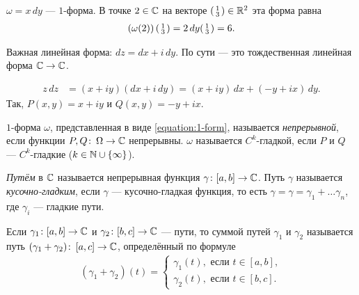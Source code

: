 \begin{exmpl*}
 $\omega = x \, dy$ --- $1$-форма. В точке $2 \in \mathbb{C}$ на векторе $ \begin{psmallmatrix}
  1 \\ 3
 \end{psmallmatrix} \in \mathbb{R}^{2}$ эта форма равна
 \begin{align*}
  \left(\omega (2)\right) \begin{psmallmatrix}
   1 \\ 3
  \end{psmallmatrix}= 2 \, dy \begin{psmallmatrix}
   1 \\ 3
  \end{psmallmatrix} = 6
 .\end{align*} 
\end{exmpl*}
\begin{exmpl*}
 Важная линейная форма: $dz = dx + i\,dy$. По сути --- это тождественная линейная форма $\mathbb{C} \to \mathbb{C}$.
\end{exmpl*}
\begin{exmpl*}
 \begin{align*}
  z\,dz &= (x + iy)(dx + i\,dy) = (x + iy)\,dx + (-y +ix)\,dy
 .\end{align*} Так, $P(x,y) = x + iy$ и $Q(x,y) = -y + ix$.
\end{exmpl*}
\begin{df*}
 $1$-форма $\omega$, представленная в виде \eqref{equation:1-form}, называется \textit{непрерывной}, если функции $P,Q \colon\, \Omega \to \mathbb{C}$ непрерывны. $\omega$ называется $C^{k}$-гладкой, если $P$ и $Q$ --- $C^{k}$-гладкие ($k \in \mathbb{N} \cup \left\{ \infty \right\}$).
\end{df*}
\begin{df*}
 \textit{Путём} в $\mathbb{C}$ называется непрерывная функция $\gamma \colon [a,b] \to \mathbb{C}$. Путь $\gamma$ называется \textit{кусочно-гладким}, если $\gamma$ --- кусочно-гладкая функция, то есть $\gamma = \gamma = \gamma_1 + \ldots \gamma_n$, где $\gamma_i$ --- гладкие пути.

 Если $\gamma_1 \colon [a,b] \to \mathbb{C}$ и $\gamma_2 \colon [b,c] \to \mathbb{C}$ --- пути, то суммой путей $\gamma_1$ и $\gamma_2$ называется путь $(\gamma_1 + \gamma_2)\colon\, [a,c] \to \mathbb{C}$, определённый по формуле
 \begin{align*}
  (\gamma_1 + \gamma_2)(t) = \begin{cases}
   \gamma_1(t), \text{ если } t \in [a,b],  \\
   \gamma_2(t), \text{ если } t \in [b,c].
  \end{cases} 
 \end{align*} 
\end{df*}
